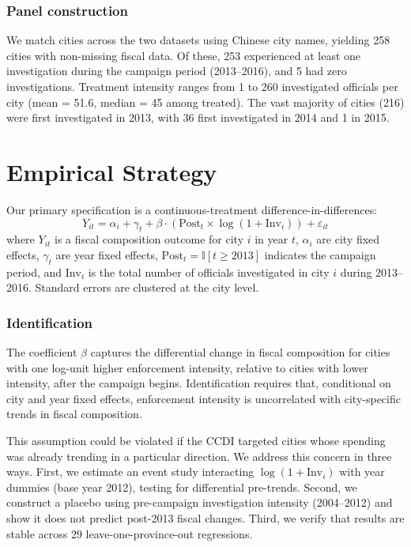 \documentclass[12pt]{article}
\newcommand{\ind}{\mathbb{I}}
\begin{document}
\subsubsection*{Panel construction} We match cities across the two datasets using Chinese city names, yielding 258 cities with non-missing fiscal data. Of these, 253 experienced at least one investigation during the campaign period (2013--2016), and 5 had zero investigations. Treatment intensity ranges from 1 to 260 investigated officials per city (mean = 51.6, median = 45 among treated). The vast majority of cities (216) were first investigated in 2013, with 36 first investigated in 2014 and 1 in 2015.




\section{Empirical Strategy}

Our primary specification is a continuous-treatment difference-in-differences:
\begin{equation}
Y_{it} = \alpha_i + \gamma_t + \beta \cdot (\text{Post}_t \times \log(1 + \text{Inv}_i)) + \varepsilon_{it}
\label{eq:main}
\end{equation}
where $Y_{it}$ is a fiscal composition outcome for city $i$ in year $t$, $\alpha_i$ are city fixed effects, $\gamma_t$ are year fixed effects, $\text{Post}_t = \ind[t \geq 2013]$ indicates the campaign period, and $\text{Inv}_i$ is the total number of officials investigated in city $i$ during 2013--2016. Standard errors are clustered at the city level.

\subsubsection*{Identification} The coefficient $\beta$ captures the differential change in fiscal composition for cities with one log-unit higher enforcement intensity, relative to cities with lower intensity, after the campaign begins. Identification requires that, conditional on city and year fixed effects, enforcement intensity is uncorrelated with city-specific trends in fiscal composition.

This assumption could be violated if the CCDI targeted cities whose spending was already trending in a particular direction. We address this concern in three ways. First, we estimate an event study interacting $\log(1 + \text{Inv}_i)$ with year dummies (base year 2012), testing for differential pre-trends. Second, we construct a placebo using pre-campaign investigation intensity (2004--2012) and show it does not predict post-2013 fiscal changes. Third, we verify that results are stable across 29 leave-one-province-out regressions.
\end{document}
